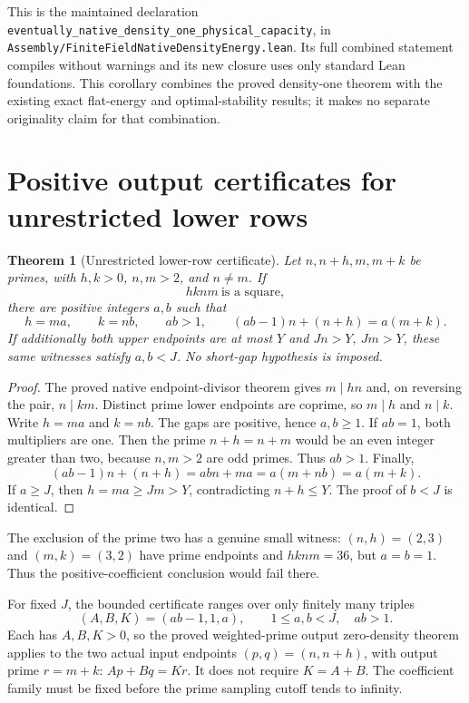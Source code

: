 \documentclass[11pt]{article}
\newtheorem{theorem}{Theorem}[section]
\begin{document}
This is the maintained declaration
\texttt{eventually\_native\_density\_one\_physical\_capacity}, in
\texttt{Assembly/\allowbreak FiniteFieldNativeDensityEnergy.\allowbreak lean}.
Its full combined statement compiles without warnings and its
new closure uses only standard Lean foundations.
This corollary combines the proved density-one theorem with
the existing exact flat-energy and optimal-stability results;
it makes no separate originality claim for that combination.

\section{Positive output certificates for unrestricted lower rows}
\label{sec:native-cross-positive-output}

\begin{theorem}[Unrestricted lower-row certificate]
\label{thm:native-cross-positive-output}
Let \(n,n+h,m,m+k\) be primes, with \(h,k>0\),
\(n,m>2\), and \(n\ne m\). If
\[
 hknm\ \text{is a square},
\]
there are positive integers \(a,b\) such that
\[
 h=ma,\qquad k=nb,\qquad ab>1,\qquad
 (ab-1)n+(n+h)=a(m+k).
\]
If additionally both upper endpoints are at most \(Y\) and
\(Jn>Y,\ Jm>Y\), these same witnesses satisfy \(a,b<J\).
No short-gap hypothesis is imposed.
\end{theorem}

\begin{proof}
The proved native endpoint-divisor theorem gives
\(m\mid hn\) and, on reversing the pair, \(n\mid km\).
Distinct prime lower endpoints are coprime, so
\(m\mid h\) and \(n\mid k\). Write \(h=ma\) and \(k=nb\).
The gaps are positive, hence \(a,b\ge1\).
If \(ab=1\), both multipliers are one. Then the prime
\(n+h=n+m\) would be an even integer greater than two,
because \(n,m>2\) are odd primes. Thus \(ab>1\).
Finally,
\[
 (ab-1)n+(n+h)=abn+ma=a(m+nb)=a(m+k).
\]
If \(a\ge J\), then \(h=ma\ge Jm>Y\), contradicting
\(n+h\le Y\). The proof of \(b<J\) is identical.
\end{proof}

The exclusion of the prime two has a genuine small witness:
\((n,h)=(2,3)\) and \((m,k)=(3,2)\) have prime endpoints
and \(hknm=36\), but \(a=b=1\).
Thus the positive-coefficient conclusion would fail there.

For fixed \(J\), the bounded certificate ranges over only finitely
many triples
\[
 (A,B,K)=(ab-1,1,a),\qquad 1\le a,b<J,\quad ab>1.
\]
Each has \(A,B,K>0\), so the proved weighted-prime output
zero-density theorem applies to the two actual input endpoints
\((p,q)=(n,n+h)\), with output prime \(r=m+k\):
\(Ap+Bq=Kr\). It does not require \(K=A+B\).
The coefficient family must be fixed before the prime sampling
cutoff tends to infinity.
\end{document}
